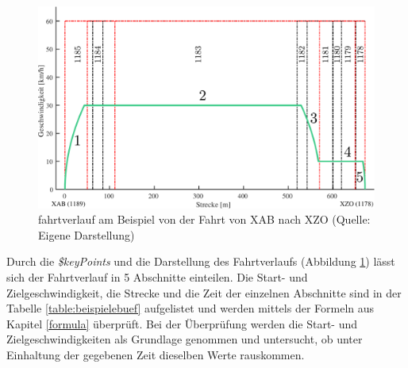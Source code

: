 \begin{figure}
\includegraphics[width=\linewidth]{../images/matlab/it14.pdf}
\caption[\Gls{fahrtverlauf} am Beispiel von der Fahrt von XAB nach XZO]{\Gls{fahrtverlauf} am Beispiel von der Fahrt von XAB nach XZO (Quelle: Eigene Darstellung)}
\label{fig:it14}
\end{figure}
Durch die \textit{\$keyPoints} und die Darstellung des Fahrtverlaufs (Abbildung \ref{fig:it14}) lässt sich der Fahrtverlauf in 5 Abschnitte einteilen. Die Start- und Zielgeschwindigkeit, die Strecke und die Zeit der einzelnen Abschnitte sind in der Tabelle \ref{table:beispielebuef} aufgelistet und werden mittels der Formeln aus Kapitel \ref{formula} überprüft. Bei der Überprüfung werden die Start- und Zielgeschwindigkeiten als Grundlage genommen und untersucht, ob unter Einhaltung der gegebenen Zeit dieselben Werte rauskommen.
